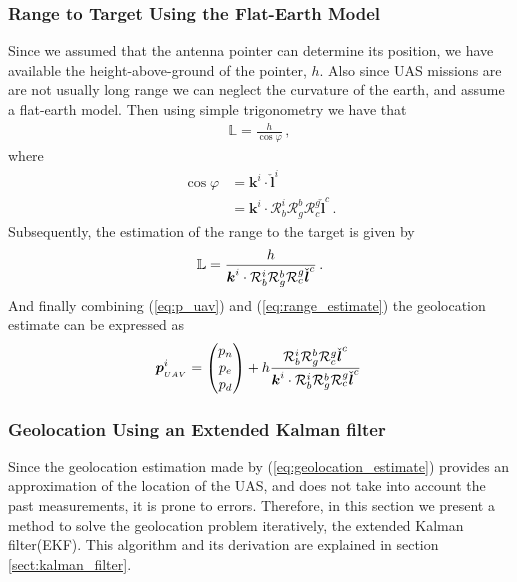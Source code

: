 \subsubsection{Range to Target Using the Flat-Earth Model}
Since we assumed that the antenna pointer can determine its position, we have available the height-above-ground of the pointer, $h$. Also since UAS missions are are not usually long range we can neglect the curvature of the earth, and assume a flat-earth model. Then using simple trigonometry we have that
\begin{align*}
\mathbb{L}=\frac{h}{\cos\varphi}\,,
\end{align*} 
where
\begin{align*}
\cos\varphi&=\boldsymbol{k}^i\cdot\check{\boldsymbol{l}}^i \\
		   &=\boldsymbol{k}^i\cdot\mathcal{R}_b^i\mathcal{R}_g^b\mathcal{R}_c^g\check{\boldsymbol{l}}^c\,.
\end{align*}
Subsequently, the estimation of the range to the target is given by
\begin{align}{\label{eq:range_estimate}}
\mathbb{L}=\frac{h}{\boldsymbol{k}^i\cdot\mathcal{R}_b^i\mathcal{R}_g^b\mathcal{R}_c^g\check{\boldsymbol{l}}^c}\,.
\end{align}
And finally combining (\ref{eq:p_uav}) and (\ref{eq:range_estimate}) the geolocation estimate can be expressed as
\begin{align}{\label{eq:geolocation_estimate}}
\boldsymbol{p}_{_{UAV}}^i=
\begin{pmatrix}
p_n \\
p_e \\
p_d 
\end{pmatrix}
+ h \frac{\mathcal{R}_b^i\mathcal{R}_g^b\mathcal{R}_c^g\check{\boldsymbol{l}}^c}{\boldsymbol{k}^i\cdot\mathcal{R}_b^i\mathcal{R}_g^b\mathcal{R}_c^g\check{\boldsymbol{l}}^c}\,
\end{align}
\subsubsection{Geolocation Using an Extended Kalman filter}{\label{sub:geolocatoin_with_EKF}}
Since the geolocation estimation made by (\ref{eq:geolocation_estimate}) provides an approximation of the location of the UAS, and does not take into account the past measurements, it is prone to errors. Therefore, in this section we present a method to solve the geolocation problem iteratively, the extended Kalman filter(EKF). This algorithm and its derivation are explained in section \ref{sect:kalman_filter}.

